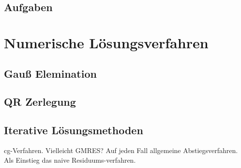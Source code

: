 \section{Aufgaben}
\begin{TODO}

\end{TODO}

\chapter{Numerische Lösungsverfahren}
\begin{TODO}

\end{TODO}

\section{Gauß Elemination}
\begin{TODO}

\end{TODO}

\section{QR Zerlegung}
\begin{TODO}

\end{TODO}

\section{Iterative Lösungsmethoden}
\begin{TODO}
cg-Verfahren. Vielleicht GMRES? Auf jeden Fall allgemeine Abstiegsverfahren. Als Einstieg das naive Residuums-verfahren.
\end{TODO}




